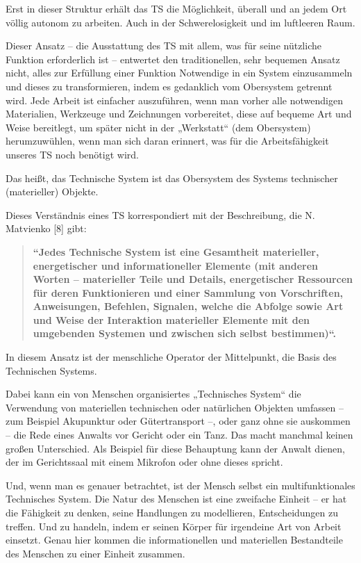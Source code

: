 \documentclass[11pt,a4paper]{article}
\begin{document}
Erst in dieser Struktur erhält das TS die Möglichkeit, überall und an jedem
Ort völlig autonom zu arbeiten. Auch in der Schwerelosigkeit und im luftleeren
Raum.

Dieser Ansatz -- die Ausstattung des TS mit allem, was für seine nützliche
Funktion erforderlich ist -- entwertet den traditionellen, sehr bequemen
Ansatz nicht, alles zur Erfüllung einer Funktion Notwendige in ein System
einzusammeln und dieses zu transformieren, indem es gedanklich vom Obersystem
getrennt wird. Jede Arbeit ist einfacher auszuführen, wenn man vorher alle
notwendigen Materialien, Werkzeuge und Zeichnungen vorbereitet, diese auf
bequeme Art und Weise bereitlegt, um später nicht in der „Werkstatt“ (dem
Obersystem) herumzuwühlen, wenn man sich daran erinnert, was für die
Arbeitsfähigkeit unseres TS noch benötigt wird.

Das heißt, das Technische System ist das Obersystem des Systems technischer
(materieller) Objekte.

Dieses Verständnis eines TS korrespondiert mit der Beschreibung, die
N. Matvienko [8] gibt: 
\begin{quote}\bf
  “Jedes Technische System ist eine Gesamtheit materieller, energetischer und
  informationeller Elemente (mit anderen Worten -- materieller Teile und
  Details, energetischer Ressourcen für deren Funktionieren und einer Sammlung
  von Vorschriften, Anweisungen, Befehlen, Signalen, welche die Abfolge sowie
  Art und Weise der Interaktion materieller Elemente mit den umgebenden
  Systemen und zwischen sich selbst bestimmen)“.
\end{quote}
In diesem Ansatz ist der menschliche Operator der Mittelpunkt, die Basis des
Technischen Systems.

Dabei kann ein von Menschen organisiertes „Technisches System“ die Verwendung
von materiellen technischen oder natürlichen Objekten umfassen -- zum Beispiel
Akupunktur oder Gütertransport --, oder ganz ohne sie auskommen -- die Rede
eines Anwalts vor Gericht oder ein Tanz. Das macht manchmal keinen großen
Unterschied.  Als Beispiel für diese Behauptung kann der Anwalt dienen, der im
Gerichtssaal mit einem Mikrofon oder ohne dieses spricht.

Und, wenn man es genauer betrachtet, ist der Mensch selbst ein
multifunktionales Technisches System. Die Natur des Menschen ist eine
zweifache Einheit -- er hat die Fähigkeit zu denken, seine Handlungen zu
modellieren, Entscheidungen zu treffen. Und zu handeln, indem er seinen Körper
für irgendeine Art von Arbeit einsetzt. Genau hier kommen die informationellen
und materiellen Bestandteile des Menschen zu einer Einheit zusammen.
\end{document}
